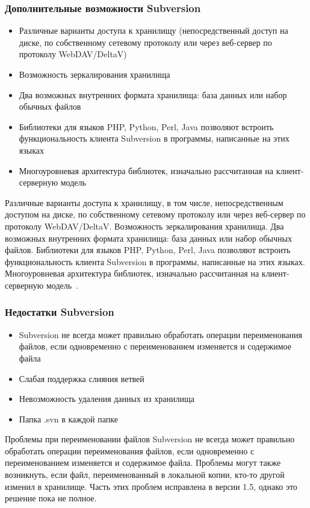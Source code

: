 \documentclass{../industrial-development}
\begin{document}
\begin{frame} \frametitle{Дополнительные возможности Subversion}
  
  \begin{itemize}
  \item Различные варианты доступа к хранилищу (непосредственный доступ на диске, по собственному сетевому протоколу или через веб-сервер по протоколу WebDAV/DeltaV)
  \item Возможность зеркалирования хранилища
  \item Два возможных внутренних формата хранилища: база данных или набор обычных файлов
  \item Библиотеки для языков PHP, Python, Perl, Java позволяют встроить функциональность клиента Subversion в программы, написанные на этих языках
  \item Многоуровневая архитектура библиотек, изначально рассчитанная на клиент-серверную модель
  \end{itemize}
\end{frame}

\lecturenotes

Различные варианты доступа к хранилищу, в том числе, непосредственным доступом на диске, по собственному сетевому протоколу или через веб-сервер по протоколу WebDAV/DeltaV.
Возможность зеркалирования хранилища.
Два возможных внутренних формата хранилища: база данных или набор обычных файлов.
Библиотеки для языков PHP, Python, Perl, Java позволяют встроить функциональность клиента Subversion в программы, написанные на этих языках.
Многоуровневая архитектура библиотек, изначально рассчитанная на клиент-серверную модель~\cite{SVNMotu}.

\begin{frame} \frametitle{Недостатки Subversion}
  \begin{itemize}
  \item Subversion не всегда может правильно обработать операции переименования файлов, если одновременно с переименованием изменяется и содержимое файла
  \item Слабая поддержка слияния ветвей
  \item Невозможность удаления данных из хранилища
  \item Папка .svn в каждой папке
  \end{itemize}
\end{frame}

\lecturenotes

Проблемы при переименовании файлов
Subversion не всегда может правильно обработать операции переименования файлов, если одновременно с переименованием изменяется и содержимое файла. Проблемы могут также возникнуть, если файл, переименованный в локальной копии, кто-то другой изменил в хранилище. Часть этих проблем исправлена в версии 1.5, однако это решение пока не полное.
\end{document}
